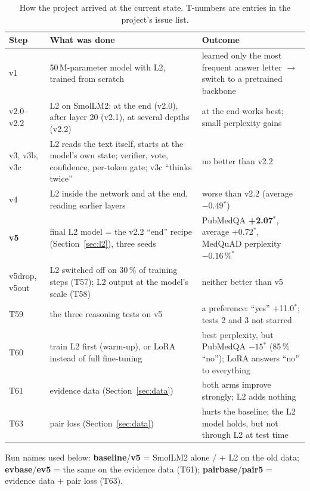 \documentclass[a4paper,11pt,parskip=half]{scrartcl}
\newcommand{\sig}{\ensuremath{^{\ast}}}
\begin{document}
\begin{table}[H]
\centering\small
\begin{tabularx}{\linewidth}{@{}p{2.0cm}YY@{}}
\toprule
Step & What was done & Outcome\\
\midrule
v1 & 50\,M-parameter model with L2, trained from scratch & learned only the most frequent answer letter $\rightarrow$ switch to a pretrained backbone\\
v2.0--v2.2 & L2 on SmolLM2: at the end (v2.0), after layer 20 (v2.1), at several depths (v2.2) & at the end works best; small perplexity gains\\
v3, v3b, v3c & L2 reads the text itself, starts at the model's own state; verifier, vote, confidence, per-token gate; v3c ``thinks twice'' & no better than v2.2\\
v4 & L2 inside the network and at the end, reading earlier layers & worse than v2.2 (average $-0.49$\sig)\\
\textbf{v5} & final L2 model = the v2.2 ``end'' recipe (Section~\ref{sec:l2}), three seeds & PubMedQA \textbf{+2.07\sig}, average +0.72\sig, MedQuAD perplexity $-0.16$\,\%\sig\\
v5drop, v5out & L2 switched off on 30\,\% of training steps (T57); L2 output at the model's scale (T58) & neither better than v5\\
T59 & the three reasoning tests on v5 & a preference: ``yes'' +11.0\sig; tests 2 and 3 not starred\\
T60 & train L2 first (warm-up), or LoRA instead of full fine-tuning & best perplexity, but PubMedQA $-15$\sig{} (85\,\% ``no''); LoRA answers ``no'' to everything\\
T61 & evidence data (Section~\ref{sec:data}) & both arms improve strongly; L2 adds nothing\\
T63 & pair loss (Section~\ref{sec:data}) & hurts the baseline; the L2 model holds, but not through L2 at test time\\
\bottomrule
\end{tabularx}
\caption{How the project arrived at the current state. T-numbers are entries in the project's issue list.}
\end{table}

Run names used below: \textbf{baseline}/\textbf{v5} = SmolLM2 alone / + L2 on the old data; \textbf{evbase}/\textbf{ev5} = the same on the evidence data (T61); \textbf{pairbase}/\textbf{pair5} = evidence data + pair loss (T63).

\end{document}
